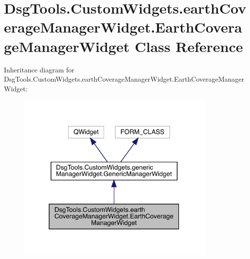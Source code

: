\hypertarget{class_dsg_tools_1_1_custom_widgets_1_1earth_coverage_manager_widget_1_1_earth_coverage_manager_widget}{}\section{Dsg\+Tools.\+Custom\+Widgets.\+earth\+Coverage\+Manager\+Widget.\+Earth\+Coverage\+Manager\+Widget Class Reference}
\label{class_dsg_tools_1_1_custom_widgets_1_1earth_coverage_manager_widget_1_1_earth_coverage_manager_widget}


Inheritance diagram for Dsg\+Tools.\+Custom\+Widgets.\+earth\+Coverage\+Manager\+Widget.\+Earth\+Coverage\+Manager\+Widget\+:
\nopagebreak
\begin{figure}[H]
\begin{center}
\leavevmode
\includegraphics[width=280pt]{class_dsg_tools_1_1_custom_widgets_1_1earth_coverage_manager_widget_1_1_earth_coverage_manager_widget__inherit__graph}
\end{center}
\end{figure}


